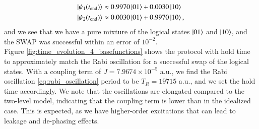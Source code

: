 \documentclass{subfiles}
\begin{document}
\begin{align*}
    \ket{\psi_1(t_{\text{end}})} &\approx 0.9970 \ket{01} + 0.0030 \ket{10}  \\
    \ket{\psi_2(t_{\text{end}})} &\approx 0.0030 \ket{01} + 0.9970 \ket{10},
\end{align*}
and we see that we have a pure mixture of the logical states $\ket{01}$ and $\ket{10}$, and the SWAP was successful within an error of $10^{-2}$.
\\
Figure \ref{fig:time_evolution_4_basefunctions} shows the protocol with hold time to approximately match the Rabi oscillation for a successful swap of the logical states. With a coupling term of $J = 7.9674 \times 10^{-5}$ a.u., we find the Rabi oscillation \eqref{eq:rabi_oscillation} period to be $T_R = 19715 $ a.u., and we set the hold time accordingly. We note that the oscillations are elongated compared to the two-level model, indicating that the coupling term is lower than in the idealized case. This is expected, as we have higher-order excitations that can lead to leakage and de-phasing effects. 
\end{document}
